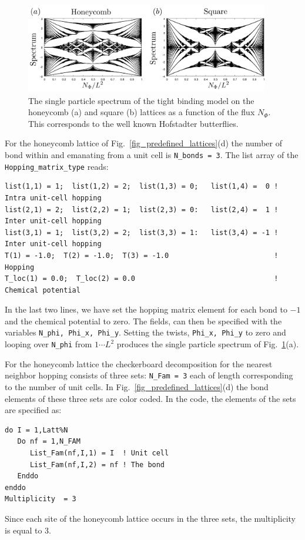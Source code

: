 \begin{figure}
\begin{center}
\includegraphics[width=0.95\textwidth,clip]{Figures/But.png}
\caption{The single particle spectrum  of the tight binding model on the  honeycomb  (a) and square (b) lattices as a function of the  flux  $N_\Phi$.    This corresponds to the well known  Hofstadter butterflies.  }
        \label{But.fig}
\end{center}
\end{figure}

For the honeycomb lattice of  Fig.~\ref{fig_predefined_lattices}(d)   the number of  bond within and emanating from  a unit cell is \texttt{N\_bonds = 3}.     The list array of the \texttt{Hopping\_matrix\_type} reads:

\begin{lstlisting}[style=fortran]
list(1,1) = 1;  list(1,2) = 2;  list(1,3) = 0;   list(1,4) =  0 ! Intra unit-cell hopping
list(2,1) = 2;  list(2,2) = 1;  list(2,3) = 0:   list(2,4) =  1 ! Inter unit-cell hopping
list(3,1) = 1;  list(3,2) = 2;  list(3,3) = 1:   list(3,4) = -1 ! Inter unit-cell hopping
T(1) = -1.0;  T(2) = -1.0;  T(3) = -1.0                         ! Hopping
T_loc(1) = 0.0;  T_loc(2) = 0.0                                 ! Chemical potential 
\end{lstlisting} 
In the last two lines, we have set the hopping matrix element  for each bond to $-1$  and the chemical potential to zero.    The fields,   can then be specified   with the  variables   \texttt{N\_phi, Phi\_x, Phi\_y}.  Setting   the twists, 
 \texttt{Phi\_x, Phi\_y}  to zero and  looping over \texttt{N\_phi}    from $ 1 \cdots L^2 $   produces  the single particle spectrum of  Fig.~\ref{But.fig}(a).  
 
 For the honeycomb lattice  the checkerboard decomposition  for the nearest neighbor hopping consists of three  sets:  \texttt{N\_Fam = 3}  each of length   corresponding  to the number of unit cells.  In  Fig.~\ref{fig_predefined_lattices}(d)  
 the bond elements of these three sets are color coded. In the code, the elements of the sets are specified as:
 
\begin{lstlisting}[style=fortran] 
do I = 1,Latt%N
   Do nf = 1,N_FAM
      List_Fam(nf,I,1) = I  ! Unit cell
      List_Fam(nf,I,2) = nf ! The bond 
   Enddo
enddo
Multiplicity  = 3
\end{lstlisting}        
Since each site of the honeycomb lattice occurs in  the three sets,  the multiplicity is equal to 3.  

